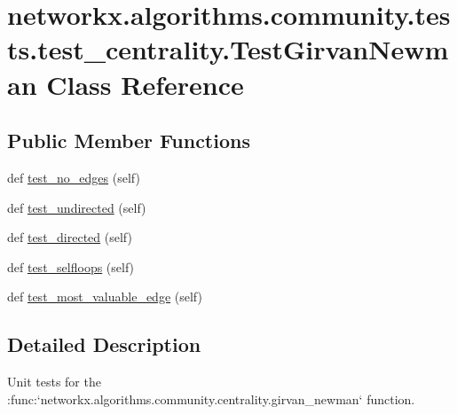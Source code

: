 \hypertarget{classnetworkx_1_1algorithms_1_1community_1_1tests_1_1test__centrality_1_1TestGirvanNewman}{}\section{networkx.\+algorithms.\+community.\+tests.\+test\+\_\+centrality.\+Test\+Girvan\+Newman Class Reference}
\label{classnetworkx_1_1algorithms_1_1community_1_1tests_1_1test__centrality_1_1TestGirvanNewman}
\subsection*{Public Member Functions}
\begin{DoxyCompactItemize}
\item 
def \hyperlink{classnetworkx_1_1algorithms_1_1community_1_1tests_1_1test__centrality_1_1TestGirvanNewman_a6cbdaca0b93491b6c73a1a24285aeb87}{test\+\_\+no\+\_\+edges} (self)
\item 
def \hyperlink{classnetworkx_1_1algorithms_1_1community_1_1tests_1_1test__centrality_1_1TestGirvanNewman_a6e3d940157ba197e51c6eea65207390e}{test\+\_\+undirected} (self)
\item 
def \hyperlink{classnetworkx_1_1algorithms_1_1community_1_1tests_1_1test__centrality_1_1TestGirvanNewman_a6e71fafc9576f675e4c78d570485a241}{test\+\_\+directed} (self)
\item 
def \hyperlink{classnetworkx_1_1algorithms_1_1community_1_1tests_1_1test__centrality_1_1TestGirvanNewman_a0ef9a51ba1c23c2dcaacd960dfcbf564}{test\+\_\+selfloops} (self)
\item 
def \hyperlink{classnetworkx_1_1algorithms_1_1community_1_1tests_1_1test__centrality_1_1TestGirvanNewman_a343e9f7a1bbc5035ad69a1a700d9b8d0}{test\+\_\+most\+\_\+valuable\+\_\+edge} (self)
\end{DoxyCompactItemize}


\subsection{Detailed Description}
\begin{DoxyVerb}Unit tests for the
:func:`networkx.algorithms.community.centrality.girvan_newman`
function.\end{DoxyVerb}
 

